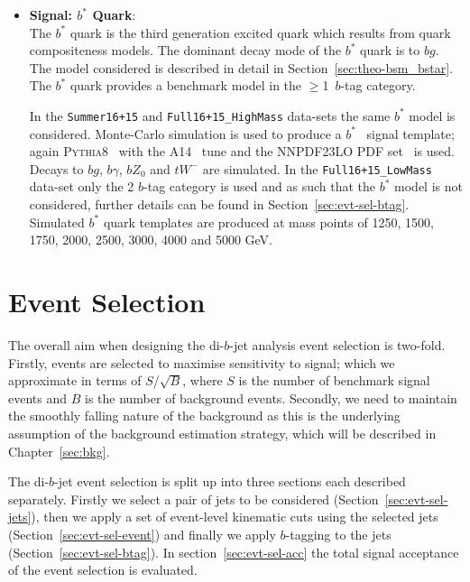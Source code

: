 \begin{itemize}[leftmargin=*]
\item\textbf{Signal: $b^*$ Quark}: \\
  The $b^*$ quark is the third generation excited quark which results from
  quark compositeness models.
  The dominant decay mode of the  $b^*$ quark is to $bg$.
  The model considered is
  described in detail in Section~\ref{sec:theo-bsm_bstar}.
  The $b^*$ quark provides a benchmark model in the $\geq$1~$b$-tag category.
    
  
  In the \verb|Summer16+15| and \verb|Full16+15_HighMass|
  data-sets the same $b^*$ model is considered.
  Monte-Carlo simulation is used to produce a $b^*$ \mjj~signal template;
  again \textsc{Pythia8}~\cite{dibjet-pythia8} with the A14~\cite{dibjet-a14} tune and the NNPDF23LO PDF set~\cite{dibjet-nnpdf} is used.
  Decays to $bg$, $b\gamma$, $bZ_0$ and $tW^{-}$ are simulated.
  In the \verb|Full16+15_LowMass| data-set
  only the 2 $b$-tag category is used
  and as such that the $b^*$ model is not considered,
  further details can be found in Section~\ref{sec:evt-sel-btag}.
  Simulated $b^*$ quark templates are produced at mass points of
  1250, 1500, 1750, 2000, 2500, 3000, 4000 and 5000 GeV.
\end{itemize}

\section{Event Selection}
\label{sec:evt-sel}

The overall aim when designing the di-$b$-jet analysis event selection
is two-fold.
Firstly, events are selected to
maximise sensitivity to signal;
which we approximate in terms of $S$/$\sqrt{B}$,
where $S$ is the number of benchmark signal events and $B$ is the number of background events.
Secondly, we need to maintain the smoothly falling nature of the background
as this is the underlying assumption of the background estimation strategy,
which will be described in Chapter~\ref{sec:bkg}.

The di-$b$-jet event selection is split up into three sections each described separately.
Firstly we select a pair of jets to be considered (Section~\ref{sec:evt-sel-jets}),
then we apply a set of event-level kinematic cuts using the selected jets (Section~\ref{sec:evt-sel-event})
and finally we apply $b$-tagging to the jets (Section~\ref{sec:evt-sel-btag}).
In section~\ref{sec:evt-sel-acc} the total signal acceptance of the
event selection is evaluated.

